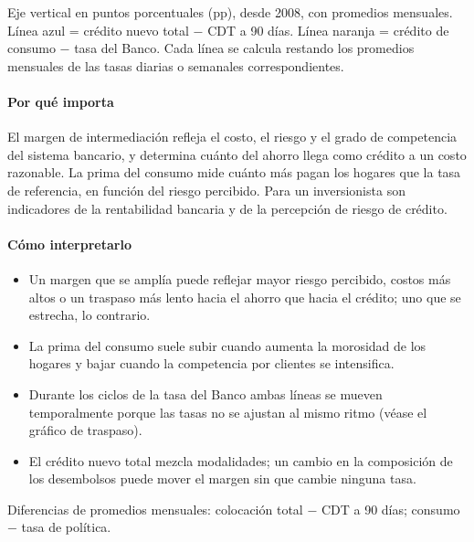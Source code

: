 \begin{leer}
Eje vertical en puntos porcentuales (pp), desde 2008, con promedios mensuales. Línea azul = crédito nuevo total − CDT a 90 días. Línea naranja = crédito de consumo − tasa del Banco. Cada línea se calcula restando los promedios mensuales de las tasas diarias o semanales correspondientes.
\end{leer}

\paragraph{Por qué importa}
El margen de intermediación refleja el costo, el riesgo y el grado de competencia del sistema bancario, y determina cuánto del ahorro llega como crédito a un costo razonable. La prima del consumo mide cuánto más pagan los hogares que la tasa de referencia, en función del riesgo percibido. Para un inversionista son indicadores de la rentabilidad bancaria y de la percepción de riesgo de crédito.

\paragraph{Cómo interpretarlo}
\begin{itemize}
\item Un margen que se amplía puede reflejar mayor riesgo percibido, costos más altos o un traspaso más lento hacia el ahorro que hacia el crédito; uno que se estrecha, lo contrario.
\item La prima del consumo suele subir cuando aumenta la morosidad de los hogares y bajar cuando la competencia por clientes se intensifica.
\item Durante los ciclos de la tasa del Banco ambas líneas se mueven temporalmente porque las tasas no se ajustan al mismo ritmo (véase el gráfico de traspaso).
\item El crédito nuevo total mezcla modalidades; un cambio en la composición de los desembolsos puede mover el margen sin que cambie ninguna tasa.
\end{itemize}
\begin{formulas}[Fórmulas]
\end{formulas}
\begin{metodo}[Metodología]
Diferencias de promedios mensuales: colocación total − CDT a 90 días; consumo − tasa de política.
\par{}
\end{metodo}

